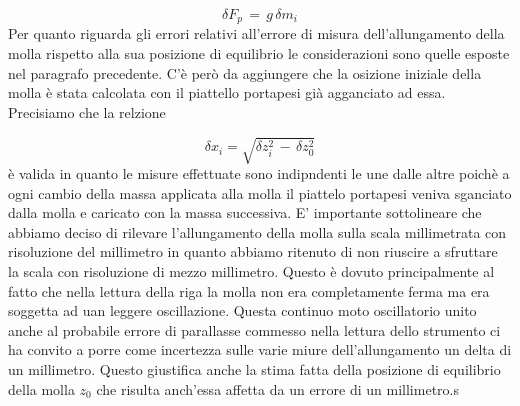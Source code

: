 \begin{equation*}
	\delta F_{p}\, =\, g\,\delta m_i
\end{equation*}
Per quanto riguarda gli errori relativi all'errore di misura dell'allungamento della molla rispetto alla sua posizione di equilibrio le considerazioni sono quelle esposte nel paragrafo precedente. C'è però da aggiungere che la osizione iniziale della molla è stata calcolata con il piattello portapesi già agganciato ad essa.
Precisiamo che la relzione

\begin{equation*}
	\delta x_i = \sqrt{\delta z_i^2\,-\,\delta z_0^2}
\end{equation*}
è valida in quanto le misure effettuate sono indipndenti le une dalle altre poichè a ogni cambio della massa applicata alla molla il piattelo portapesi veniva sganciato dalla molla e caricato con la massa successiva.
E' importante sottolineare che abbiamo deciso di rilevare l'allungamento della molla sulla scala millimetrata con risoluzione del millimetro in quanto abbiamo ritenuto di non riuscire a sfruttare la scala con risoluzione di mezzo millimetro. Questo è dovuto principalmente al fatto che nella lettura della riga la molla non era completamente ferma ma era soggetta ad uan leggere oscillazione. Questa continuo moto oscillatorio unito anche al probabile errore di parallasse commesso nella lettura dello strumento ci ha convito a porre come incertezza sulle varie miure dell'allungamento un delta di un millimetro. Questo giustifica anche la stima fatta della posizione di equilibrio della molla $z_0$ che risulta anch'essa affetta da un errore di un millimetro.s

